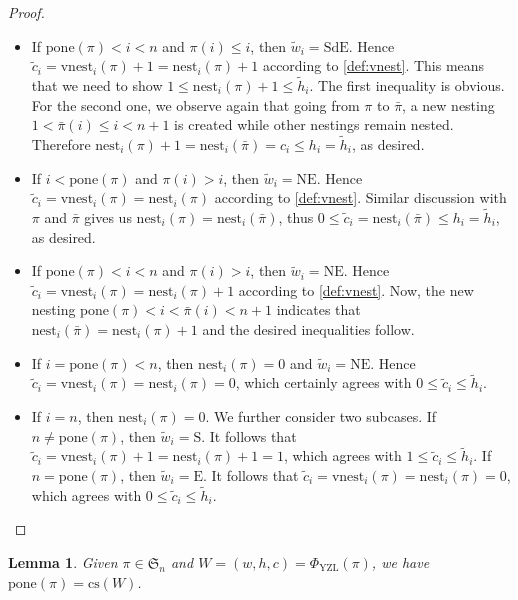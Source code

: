 \documentclass[12pt]{amsart}
\numberwithin{equation}{section}
\theoremstyle{plain}
\newtheorem{lemma}[theorem]{Lemma}
\theoremstyle{definition}
\def\YZL{\mathrm{YZL}}
\def\SS{\mathfrak{S}}
\def\S{\mathrm{S}}
\def\E{\mathrm{E}}
\def\NE{\mathrm{NE}}
\def\SdE{\mathrm{SdE}}
\def\cs{\mathrm{cs}}
\def\pone{\mathrm{pone}}
\def\vnest{\mathrm{vnest}}
\def\nest{\mathrm{nest}}
\begin{document}
\begin{proof}
\begin{itemize}
  \item  If $\pone(\pi)<i<n$ and $\pi(i) \leq i$, then $\widetilde{w}_i=\SdE$. Hence $\widetilde{c}_i=\vnest_i(\pi)+1=\nest_i(\pi)+1$ according to \eqref{def:vnest}. This means that we need to show $1 \le \nest_i(\pi)+1 \le \widetilde{h}_i$. The first inequality is obvious. For the second one, we observe again that going from $\pi$ to $\bar{\pi}$, a new nesting $1 < \bar{\pi}(i) \le i < n+1$ is created while other nestings remain nested. Therefore $\nest_i(\pi)+1=\nest_i(\bar{\pi})=c_i\le h_i=\widetilde{h}_i$, as desired.

  \item  If $i < \pone(\pi)$ and $\pi(i) > i$, then $\widetilde{w}_i=\NE$. Hence $\widetilde{c}_i=\vnest_i(\pi)=\nest_i(\pi)$ according to \eqref{def:vnest}. Similar discussion with $\pi$ and $\bar{\pi}$ gives us $\nest_i(\pi)=\nest_i(\bar{\pi})$, thus $0\le \widetilde{c}_i=\nest_i(\bar{\pi})\le h_i=\widetilde{h}_i$, as desired.

  \item  If $\pone(\pi)<i<n$ and $\pi(i) > i$, then $\widetilde{w}_i=\NE$. Hence $\widetilde{c}_i=\vnest_i(\pi)=\nest_i(\pi)+1$ according to \eqref{def:vnest}. Now, the new nesting $\pone(\pi)<i<\bar{\pi}(i)<n+1$ indicates that $\nest_i(\bar{\pi})=\nest_i(\pi)+1$ and the desired inequalities follow.

  \item If $i=\pone(\pi) < n$, then $\nest_i(\pi)=0$ and $\widetilde{w}_i=\NE$. Hence $\widetilde{c}_i=\vnest_i(\pi)=\nest_i(\pi)=0$, which certainly agrees with $0 \le \widetilde{c}_i \le \widetilde{h}_i$.

  \item If $i=n$, then $\nest_i(\pi)=0$. We further consider two subcases. If $n \neq \pone(\pi)$, then $\widetilde{w}_i=\S$. It follows that $\widetilde{c}_i=\vnest_i(\pi)+1=\nest_i(\pi)+1=1$, which agrees with $1\le \widetilde{c}_i\le \widetilde{h}_i$. If $n=\pone(\pi)$, then $\widetilde{w}_i=\E$. It follows that $\widetilde{c}_i=\vnest_i(\pi)=\nest_i(\pi)=0$, which agrees with $0 \leq \widetilde{c}_i \le \widetilde{h}_i$.
\end{itemize}
\end{proof}

\begin{lemma}\label{lem:cspone}
Given $\pi \in \SS_n$ and $W=(w,h,c)=\Phi_{\YZL}(\pi)$,
we have $\pone(\pi)=\cs(W)$.
\end{lemma}
\end{document}
